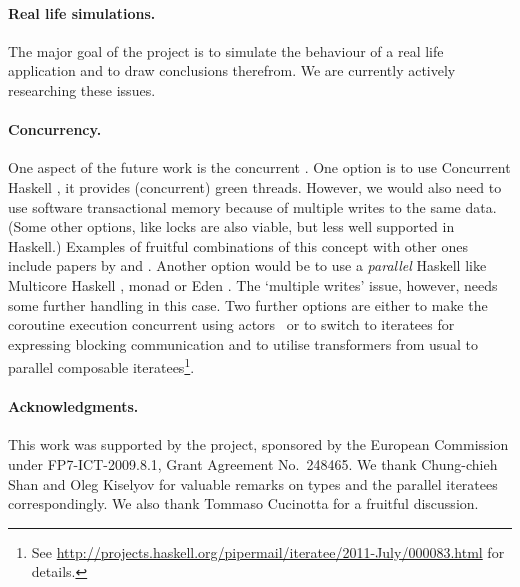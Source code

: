 \paragraph{Real life simulations.}
The major goal of the project is to simulate the behaviour of a real life application and to draw conclusions therefrom.
We are currently actively researching these issues.

\paragraph{Concurrency.}
One aspect of the future work is the concurrent \soosim.
One option is to use Concurrent Haskell \cite{ConcHs}, it provides (concurrent) green threads.
However, we would also need to use software transactional memory
\cite{springerlink:10.1007/s004460050028} because of multiple writes
to the same data. (Some other options, like locks are also viable, but
less well supported in Haskell.)
Examples of fruitful combinations of this concept with other ones include papers by \citeauthor{Harris:2008:CMT:1378704.1378725} \cite{Harris:2008:CMT:1378704.1378725} and \citeauthor{Bieniusa:2010:BAA:1835698.1835714} \cite{Bieniusa:2010:BAA:1835698.1835714,springerlink:10.1007/978-3-642-25959-3_2}.
Another option would be to use a \emph{parallel} Haskell like Multicore Haskell \cite{marlow:rsm},  monad \cite{par-monad} or Eden \cite{eden}.
The `multiple writes' issue, however, needs some further handling in this case.
Two further options are either to make the coroutine execution concurrent using actors~\cite{Hewitt:1973:UMA:1624775.1624804,sulzmann2008actors} or to switch to iteratees for expressing blocking communication and to utilise transformers from usual to parallel composable iteratees\footnote{See \url{http://projects.haskell.org/pipermail/iteratee/2011-July/000083.html} for details.}.

%

\paragraph{Acknowledgments.}
This work was supported by the \soos project, sponsored by the European Commission under FP7-ICT-2009.8.1, Grant Agreement No.~248465.
We thank Chung-chieh Shan and Oleg Kiselyov for valuable remarks on
 types and the parallel iteratees correspondingly.
We also thank Tommaso Cucinotta for a fruitful discussion.


